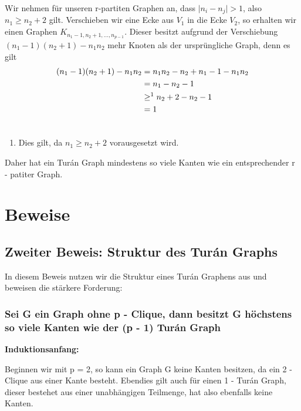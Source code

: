 \documentclass[12pt, a4paper]{article}
\begin{document}
Wir nehmen für unseren r-partiten Graphen an, dass $\mid n_i - n_j \mid > 1$, also $n_1 \ge n_2 + 2$ gilt.
Verschieben wir eine Ecke aus $V_1$ in die Ecke $V_2$, so erhalten wir einen Graphen $K_{n_1 - 1, n_2 + 1,...,n_{p - 1}}$. Dieser besitzt aufgrund der Verschiebung $(n_1 - 1)(n_2 + 1) - n_1 n_2$ mehr Knoten als der ursprüngliche Graph, denn es gilt
\begin{gather}
\begin{split}(n_1 - 1)(n_2 + 1) - n_1 n_2 &= n_1 n_2 - n_2 + n_1 - 1 - n_1 n_2 \\
&= n_1 - n_2 - 1 \\
&\ge^1 n_2 + 2 - n_2 - 1 \\
&= 1\end{split}\notag\\\begin{split}\end{split}\notag
\end{gather}\begin{enumerate}
\item {} 
Dies gilt, da $n_1 \ge n_2 + 2$ vorausgesetzt wird.

\end{enumerate}

Daher hat ein Turán Graph mindestens so viele Kanten wie ein entsprechender r - patiter Graph.


\chapter{Beweise}
\label{proof::doc}\label{proof:beweise}

\section{Zweiter Beweis: Struktur des Turán Graphs}
\label{proof/second:zweiter-beweis-struktur-des-turan-graphs}\label{proof/second::doc}
In diesem Beweis nutzen wir die Struktur eines Turán Graphens aus und beweisen die stärkere Forderung:


\subsection{Sei G ein Graph ohne p - Clique, dann besitzt G höchstens so viele Kanten wie der (p - 1) Turán Graph}
\label{proof/second:sei-g-ein-graph-ohne-p-clique-dann-besitzt-g-hochstens-so-viele-kanten-wie-der-p-1-turan-graph}
\textbf{Induktionsanfang:}

Beginnen wir mit p = 2, so kann ein Graph G keine Kanten besitzen, da ein 2 - Clique aus einer Kante besteht. Ebendies gilt auch für einen 1 - Turán Graph, dieser bestehet aus einer unabhängigen Teilmenge, hat also ebenfalls keine Kanten.
\end{document}
